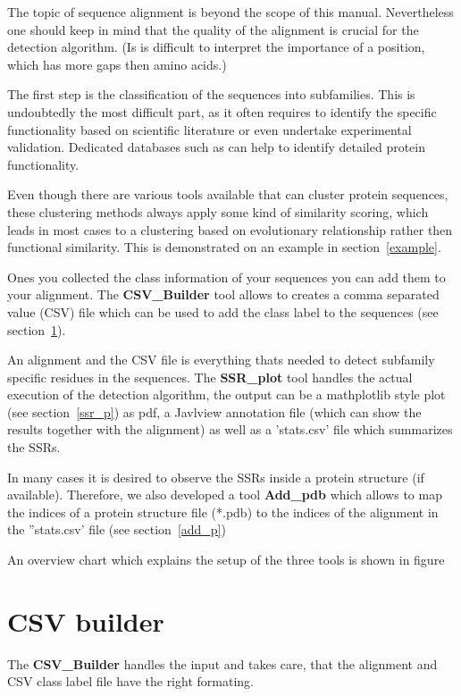 \documentclass[a4paper,10pt]{article}
\begin{document}
The topic of sequence alignment is beyond the scope of this manual.  
Nevertheless one should keep in mind that 
the quality of the alignment is crucial for the detection algorithm.
(Is is difficult to interpret the importance of a position, which has
more gaps then amino acids.)

The first step is the classification of the sequences into subfamilies.
This is undoubtedly the most difficult part, as it often requires 
to identify the specific functionality based on scientific literature
or even undertake experimental validation. Dedicated databases such as 
 can help to identify 
detailed protein functionality. 

Even though there are various tools available that can cluster protein sequences, 
these clustering methods always apply some kind of similarity scoring,
which leads in most cases to a clustering based on evolutionary relationship 
rather then functional similarity. 
This is demonstrated on an example in section~\ref{example}.

Ones you collected the class information of your sequences you can add
them to your alignment. The \textbf{CSV\_Builder} tool allows to creates 
a comma separated value (CSV) file which can be used to add the class label to the sequences
(see section~\ref{csv_b}).

An alignment and the CSV file is everything thats needed to 
detect subfamily specific residues in the sequences. 
The \textbf{SSR\_plot} tool handles the actual execution of the detection
algorithm, the output can be a mathplotlib  style plot (see section~\ref{ssr_p})
as pdf, a Javlview annotation file (which can show the results together with the 
alignment) as well as a 'stats.csv' file which summarizes the SSRs.

In many cases it is desired to observe the SSRs inside a protein 
structure (if available). Therefore, we also developed a tool \textbf{Add\_pdb} which allows
to map the indices of a protein structure file (*.pdb) to the indices of the 
alignment in the ''stats.csv' file (see section~\ref{add_p})

An overview chart which explains the setup of the three tools is shown in
figure~

\section{CSV builder} \label{csv_b}

The \textbf{CSV\_Builder} handles the input and takes care, 
that the alignment and CSV class label file have the right formating.
\end{document}
